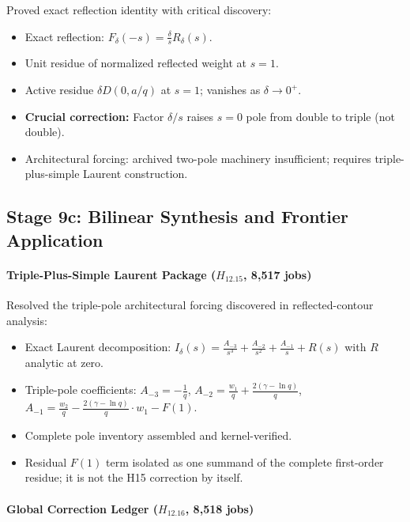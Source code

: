 \documentclass[11pt,a4paper]{article}
\theoremstyle{plain}
\theoremstyle{definition}
\theoremstyle{remark}
\begin{document}
Proved exact reflection identity with critical discovery:
\begin{itemize}[leftmargin=2em]
  \item Exact reflection: $F_\delta(-s) = \frac{\delta}{s}R_\delta(s)$.
  \item Unit residue of normalized reflected weight at $s=1$.
  \item Active residue $\delta D(0,a/q)$ at $s=1$; vanishes as $\delta \to 0^+$.
  \item \textbf{Crucial correction:} Factor $\delta/s$ raises $s=0$ pole from double to triple (not double).
  \item Architectural forcing: archived two-pole machinery insufficient; requires triple-plus-simple Laurent construction.
\end{itemize}

\subsection{Stage 9c: Bilinear Synthesis and Frontier Application}

\paragraph{Triple-Plus-Simple Laurent Package ($H_{12.15}$, 8,517 jobs)}

Resolved the triple-pole architectural forcing discovered in reflected-contour analysis:
\begin{itemize}[leftmargin=2em]
  \item Exact Laurent decomposition: $I_\delta(s) = \frac{A_{-3}}{s^3} + \frac{A_{-2}}{s^2} + \frac{A_{-1}}{s} + R(s)$ with $R$ analytic at zero.
  \item Triple-pole coefficients: $A_{-3} = -\frac{1}{q}$, $A_{-2} = \frac{w_1}{q} + \frac{2(\gamma-\ln q)}{q}$, $A_{-1} = \frac{w_2}{q} - \frac{2(\gamma-\ln q)}{q} \cdot w_1 - F(1)$.
  \item Complete pole inventory assembled and kernel-verified.
  \item Residual $F(1)$ term isolated as one summand of the complete first-order residue; it is not the H15 correction by itself.
\end{itemize}

\paragraph{Global Correction Ledger ($H_{12.16}$, 8,518 jobs)}
\end{document}

